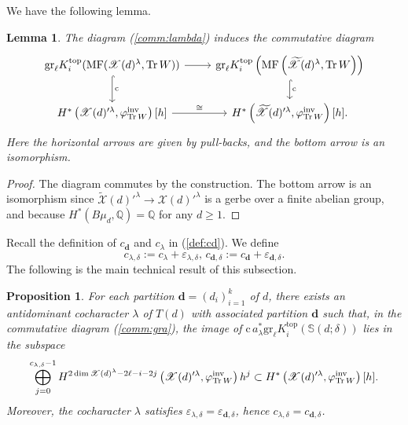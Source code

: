 \documentclass [11pt,oneside,a4paper,mathscr]{amsart}
\newtheorem{prop}[thm]{Proposition}
\newtheorem{lemma}[thm]{Lemma}
\theoremstyle{definition}
\renewcommand{\geq}{\geqslant}
\newcommand{\X}{\mathscr{X}}
\newcommand{\Tr}{\mathop{\rm Tr}}
\begin{document}
We have the following lemma. 
\begin{lemma}\label{lem:comm:gerb}
The diagram (\ref{comm:lambda}) induces the commutative diagram 
\begin{equation*}
       \begin{tikzcd}
            \mathrm{gr}_\ell K^{\mathrm{top}}_i(\mathrm{MF}(\X(d)^{\lambda}, \Tr W)) \arrow[d, hook, "\mathrm{c}"]\arrow[r]& 
            \mathrm{gr}_{\ell} K^{\mathrm{top}}_i\left(\mathrm{MF}\left(\widetilde{\X}(d)^{\lambda}, \mathrm{Tr}\,W\right)\right)\arrow[d, hook, "\mathrm{c}"]\\
            H^{\ast}\left(\X(d)'^{\lambda}, \varphi_{\mathrm{Tr}\,W}^{\mathrm{inv}}\right)[h]\arrow[r, "\cong"]&  H^{\ast}\left(\widetilde{\X}(d)'^{\lambda}, \varphi_{\mathrm{Tr}\,W}^{\mathrm{inv}}\right)[h]. 
        \end{tikzcd}
\end{equation*}
Here the horizontal arrows are given by pull-backs, 
and the bottom arrow is an isomorphism. 
\end{lemma}
\begin{proof}
The diagram commutes by the construction. 
The bottom arrow is an isomorphism since 
$\widetilde{\X}(d)'^{\lambda} \to \X(d)'^{\lambda}$ is a gerbe over 
a finite abelian group, and because $H^{\ast}(B\mu_d, \mathbb{Q})=\mathbb{Q}$ for any $d\geq 1$. 
\end{proof}

Recall the definition of $c_{\mathbf{d}}$ and $c_{\lambda}$ in (\ref{def:cd}). 
We define 
\begin{equation}\label{def:width}
c_{\lambda, \delta}:=c_\lambda+\varepsilon_{\lambda,\delta},\, c_{\mathbf{d}, \delta}:=c_\mathbf{d}+\varepsilon_{\mathbf{d},\delta}.
\end{equation}
The following is the main technical result of this subsection. 
\begin{prop}\label{prop06}
For each partition $\mathbf{d}=(d_i)_{i=1}^k$ of $d$, 
there exists an antidominant cocharacter $\lambda$ of $T(d)$ with 
associated partition $\mathbf{d}$ such that, 
in the commutative diagram (\ref{comm:gra}),
       the image of $\mathrm{c}\,a^*_\lambda\mathrm{gr}_{\ell}K^{\mathrm{top}}_i\left(\mathbb{S}(d; \delta)\right)$ lies in the subspace 
    \[\bigoplus_{j=0}^{c_{\lambda, \delta}-1}H^{2\dim \X(d)^{\lambda}-2\ell-i-2j}\left(\X(d)'^{\lambda}, \varphi_{\Tr W}^{\mathrm{inv}}\right) h^j\subset 
    H^\ast\left(\X(d)'^{\lambda}, \varphi_{\Tr W}^{\mathrm{inv}}\right)[h].\]
    Moreover, the cocharacter $\lambda$ satisfies $\varepsilon_{\lambda, \delta}=\varepsilon_{\mathbf{d}, \delta}$, 
    hence $c_{\lambda, \delta}=c_{\mathbf{d}, \delta}$. 
\end{prop}
\end{document}
